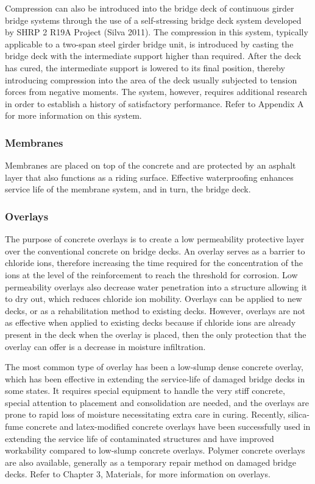 Compression can also be introduced into the bridge deck of continuous girder bridge systems through the use of a
self-stressing bridge deck system developed by SHRP 2 R19A Project (Silva 2011). The compression in this system,
typically applicable to a two-span steel girder bridge unit, is introduced by casting the bridge deck with the
intermediate support higher than required. After the deck has cured, the intermediate support is lowered to its final
position, thereby introducing compression into the area of the deck usually subjected to tension forces from negative
moments. The system, however, requires additional research in order to establish a history of satisfactory
performance. Refer to Appendix A for more information on this system.

\subsubsection{Membranes}
Membranes are placed on top of the concrete and are protected by an asphalt layer that also functions as a riding
surface. Effective waterproofing enhances service life of the membrane system, and in turn, the bridge deck.

\subsubsection{Overlays}
The purpose of concrete overlays is to create a low permeability protective layer over the conventional concrete
on bridge decks. An overlay serves as a barrier to chloride ions, therefore increasing the time required for the
concentration of the ions at the level of the reinforcement to reach the threshold for corrosion. Low permeability
overlays also decrease water penetration into a structure allowing it to dry out, which reduces chloride ion mobility.
Overlays can be applied to new decks, or as a rehabilitation method to existing decks. However, overlays are not as
effective when applied to existing decks because if chloride ions are already present in the deck when the overlay is
placed, then the only protection that the overlay can offer is a decrease in moisture infiltration.

The most common type of overlay has been a low-slump dense concrete overlay, which has been effective in
extending the service-life of damaged bridge decks in some states. It requires special equipment to handle the very stiff concrete, special attention to placement and consolidation are needed, and the overlays are prone to rapid loss of
moisture necessitating extra care in curing. Recently, silica-fume concrete and latex-modified concrete overlays have
been successfully used in extending the service life of contaminated structures and have improved workability
compared to low-slump concrete overlays. Polymer concrete overlays are also available, generally as a temporary
repair method on damaged bridge decks. Refer to Chapter 3, Materials, for more information on overlays.

